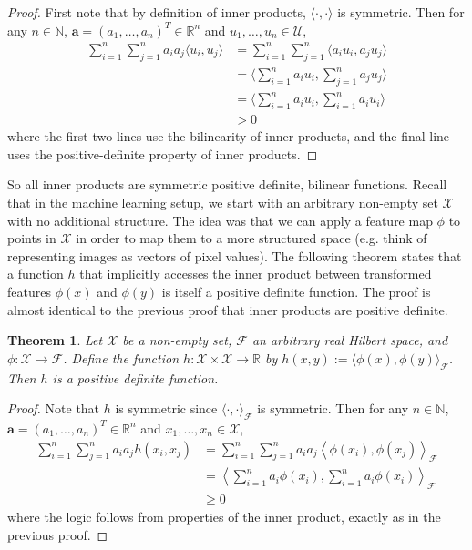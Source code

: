 \documentclass[12pt]{article}
\newcommand{\R}{\mathbb{R}}
\newtheorem{thm}{Theorem}
\begin{document}
\begin{proof}
 First note that by definition of inner products, $\langle \cdot, \cdot \rangle$ is symmetric. Then for any $n \in \mathbb{N}$, $\mathbf{a} = (a_1, \dots, a_n)^T \in \R^n$ and 
 $u_1, \dots, u_n \in \mathcal{U}$, 
 \begin{align*}
 \sum_{i = 1}^{n} \sum_{j = 1}^{n} a_i a_j \langle u_i, u_j \rangle &=  \sum_{i = 1}^{n} \sum_{j = 1}^{n} \langle a_i u_i, a_j u_j \rangle \\
 										                 &= \langle \sum_{i = 1}^{n}  a_i u_i, \sum_{j = 1}^{n}  a_j u_j \rangle  \\
										                 &= \langle \sum_{i = 1}^{n}  a_i u_i, \sum_{i = 1}^{n}  a_i u_i \rangle \\
										                 &> 0
 \end{align*}
 where the first two lines use the bilinearity of inner products, and the final line uses the positive-definite property of inner products. 
\end{proof}
 So all inner products are symmetric positive definite, bilinear functions. Recall that in the machine learning setup, we start with an arbitrary non-empty set $\mathcal{X}$ with no additional structure. The idea 
 was that we can apply a feature map $\phi$ to points in $\mathcal{X}$ in order to map them to a more structured space (e.g. think of representing images as vectors of pixel values). The following theorem states 
 that a function $h$ that implicitly accesses the inner product between transformed features $\phi(x)$ and $\phi(y)$ is itself a positive definite function. The proof is almost identical to the previous proof that inner 
 products are positive definite. 
 \begin{thm}
 Let $\mathcal{X}$ be a non-empty set, $\mathcal{F}$ an arbitrary real Hilbert space, and $\phi: \mathcal{X} \to \mathcal{F}$. Define the function $h: \mathcal{X} \times \mathcal{X} \to \R$ by 
 $h(x, y) := \langle \phi(x), \phi(y) \rangle_{\mathcal{F}}$. Then $h$ is a positive definite function. 
 \end{thm}
 \begin{proof}
 Note that $h$ is symmetric since $\langle \cdot, \cdot \rangle_{\mathcal{F}}$ is symmetric. Then for any $n \in \mathbb{N}$, $\mathbf{a} = (a_1, \dots, a_n)^T \in \R^n$ and 
 $x_1, \dots, x_n \in \mathcal{X}$, 
 \begin{align*}
 \sum_{i = 1}^{n} \sum_{j = 1}^{n} a_i a_j h(x_i, x_j) &=  \sum_{i = 1}^{n} \sum_{j = 1}^{n} a_i a_j  \left\langle \phi(x_i), \phi(x_j) \right\rangle_{\mathcal{F}} \\
 									      &= \left\langle  \sum_{i = 1}^{n} a_i \phi(x_i), \sum_{i = 1}^{n}  a_i \phi(x_i) \right\rangle_{\mathcal{F}} \\
									      &\geq 0
 \end{align*}
 where the logic follows from properties of the inner product, exactly as in the previous proof. 
 \end{proof}
\end{document}
